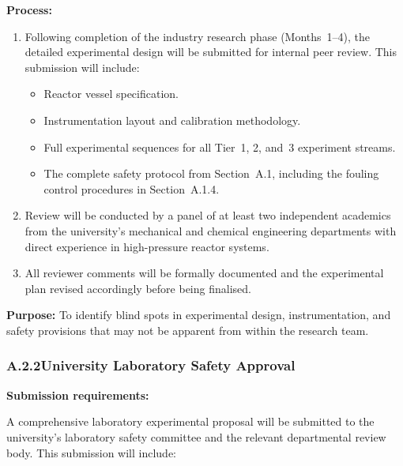 \documentclass[12pt]{article}
\begin{document}
\noindent\textbf{Process:}
\begin{enumerate}[label=\arabic*., itemsep=4pt]
    \item Following completion of the industry research phase (Months~1--4), the
    detailed experimental design will be submitted for internal peer review. This
    submission will include:
    \begin{itemize}[itemsep=2pt]
        \item Reactor vessel specification.
        \item Instrumentation layout and calibration methodology.
        \item Full experimental sequences for all Tier~1, 2, and~3 experiment
              streams.
        \item The complete safety protocol from Section~A.1, including the fouling
              control procedures in Section~A.1.4.
    \end{itemize}
    \item Review will be conducted by a panel of at least two independent academics
          from the university's mechanical and chemical engineering departments with
          direct experience in high-pressure reactor systems.
    \item All reviewer comments will be formally documented and the experimental plan
          revised accordingly before being finalised.
\end{enumerate}

\medskip
\noindent\textbf{Purpose:} To identify blind spots in experimental design,
instrumentation, and safety provisions that may not be apparent from within the
research team.

\subsubsection*{A.2.2\quad University Laboratory Safety Approval}

\noindent\textbf{Submission requirements:}

\medskip
A comprehensive laboratory experimental proposal will be submitted to the
university's laboratory safety committee and the relevant departmental review body.
This submission will include:
\end{document}
